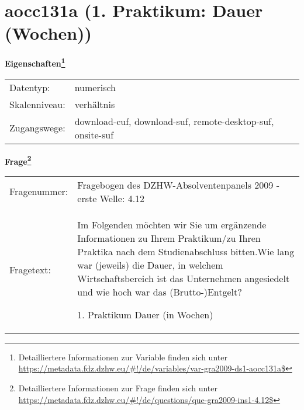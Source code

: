 
    \setcounter{footnote}{0}

    \vspace*{-1.8cm}
	\section{aocc131a (1. Praktikum: Dauer (Wochen))}
	\label{section:aocc131a}



    \vspace*{0.5cm}
    \noindent\textbf{Eigenschaften\footnote{Detailliertere Informationen zur Variable finden sich unter
		\url{https://metadata.fdz.dzhw.eu/\#!/de/variables/var-gra2009-ds1-aocc131a$}}}\\
	\begin{tabularx}{\hsize}{@{}lX}
	Datentyp: & numerisch \\
	Skalenniveau: & verhältnis \\
	Zugangswege: &
	  download-cuf, 
	  download-suf, 
	  remote-desktop-suf, 
	  onsite-suf
 \\
    \end{tabularx}



				\vspace*{0.5cm}
                \noindent\textbf{Frage\footnote{Detailliertere Informationen zur Frage finden sich unter
		              \url{https://metadata.fdz.dzhw.eu/\#!/de/questions/que-gra2009-ins1-4.12$}}}\\
				\begin{tabularx}{\hsize}{@{}lX}
					Fragenummer: &
					  Fragebogen des DZHW-Absolventenpanels 2009 - erste Welle:
					  4.12
 \\
					Fragetext: & Im Folgenden möchten wir Sie um ergänzende Informationen zu Ihrem Praktikum/zu Ihren Praktika nach dem Studienabschluss bitten.Wie lang war (jeweils) die Dauer, in welchem Wirtschaftsbereich ist das Unternehmen angesiedelt und wie hoch war das (Brutto-)Entgelt?\par  1. Praktikum Dauer (in Wochen) \\
				\end{tabularx}





